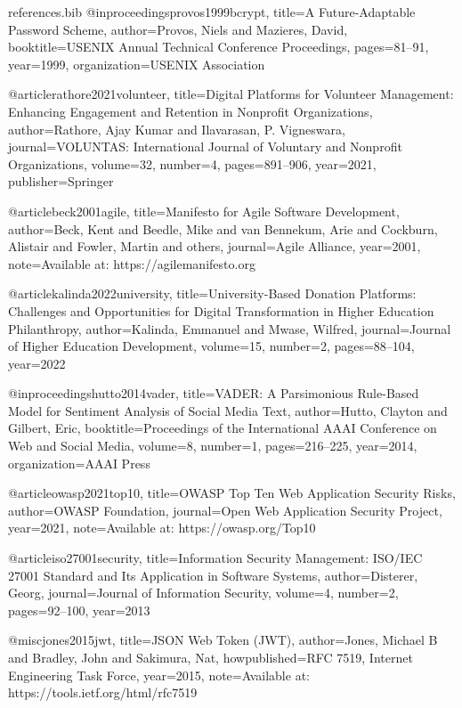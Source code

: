 \begin{filecontents}{references.bib}
@inproceedings{provos1999bcrypt,
  title={A Future-Adaptable Password Scheme},
  author={Provos, Niels and Mazieres, David},
  booktitle={USENIX Annual Technical Conference Proceedings},
  pages={81--91},
  year={1999},
  organization={USENIX Association}
}

@article{rathore2021volunteer,
  title={Digital Platforms for Volunteer Management: Enhancing Engagement and Retention in Nonprofit Organizations},
  author={Rathore, Ajay Kumar and Ilavarasan, P. Vigneswara},
  journal={VOLUNTAS: International Journal of Voluntary and Nonprofit Organizations},
  volume={32},
  number={4},
  pages={891--906},
  year={2021},
  publisher={Springer}
}

@article{beck2001agile,
  title={Manifesto for Agile Software Development},
  author={Beck, Kent and Beedle, Mike and van Bennekum, Arie and Cockburn, Alistair and Fowler, Martin and others},
  journal={Agile Alliance},
  year={2001},
  note={Available at: https://agilemanifesto.org}
}

@article{kalinda2022university,
  title={University-Based Donation Platforms: Challenges and Opportunities for Digital Transformation in Higher Education Philanthropy},
  author={Kalinda, Emmanuel and Mwase, Wilfred},
  journal={Journal of Higher Education Development},
  volume={15},
  number={2},
  pages={88--104},
  year={2022}
}

@inproceedings{hutto2014vader,
  title={{VADER}: A Parsimonious Rule-Based Model for Sentiment Analysis of Social Media Text},
  author={Hutto, Clayton and Gilbert, Eric},
  booktitle={Proceedings of the International AAAI Conference on Web and Social Media},
  volume={8},
  number={1},
  pages={216--225},
  year={2014},
  organization={AAAI Press}
}

@article{owasp2021top10,
  title={OWASP Top Ten Web Application Security Risks},
  author={{OWASP Foundation}},
  journal={Open Web Application Security Project},
  year={2021},
  note={Available at: https://owasp.org/Top10}
}

@article{iso27001security,
  title={Information Security Management: ISO/IEC 27001 Standard and Its Application in Software Systems},
  author={Disterer, Georg},
  journal={Journal of Information Security},
  volume={4},
  number={2},
  pages={92--100},
  year={2013}
}

@misc{jones2015jwt,
  title={JSON Web Token (JWT)},
  author={Jones, Michael B and Bradley, John and Sakimura, Nat},
  howpublished={RFC 7519, Internet Engineering Task Force},
  year={2015},
  note={Available at: https://tools.ietf.org/html/rfc7519}
}
\end{filecontents}

